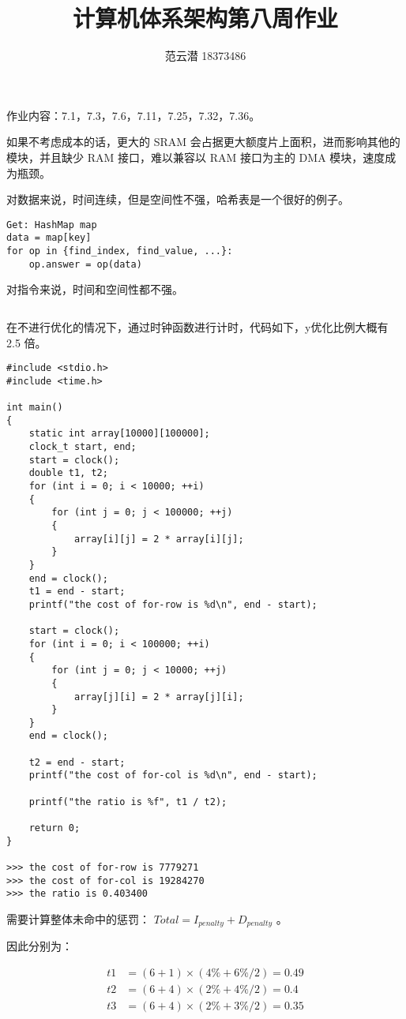\documentclass[lang=cn,11pt,a4paper,cite=authoryear]{elegantpaper}
\title{计算机体系架构\quad 第八周作业}
\author{范云潜 18373486}
\institute{微电子学院 184111 班}
\date{\zhtoday}
\begin{document}
\maketitle

作业内容：7.1，7.3，7.6，7.11，7.25，7.32，7.36。


如果不考虑成本的话，更大的 SRAM 会占据更大额度片上面积，进而影响其他的模块，并且缺少 RAM 接口，难以兼容以 RAM 接口为主的 DMA 模块，速度成为瓶颈。


对数据来说，时间连续，但是空间性不强，哈希表是一个很好的例子。

\begin{lstlisting}
Get: HashMap map
data = map[key]
for op in {find_index, find_value, ...}:
    op.answer = op(data)
\end{lstlisting}


对指令来说，时间和空间性都不强。

\begin{lstlisting}
\end{lstlisting}



在不进行优化的情况下，通过时钟函数进行计时，代码如下，y优化比例大概有 2.5 倍。

\begin{lstlisting}
#include <stdio.h>
#include <time.h>

int main()
{
    static int array[10000][100000];
    clock_t start, end;
    start = clock();
    double t1, t2;
    for (int i = 0; i < 10000; ++i)
    {
        for (int j = 0; j < 100000; ++j)
        {
            array[i][j] = 2 * array[i][j];
        }
    }
    end = clock();
    t1 = end - start;
    printf("the cost of for-row is %d\n", end - start);

    start = clock();
    for (int i = 0; i < 100000; ++i)
    {
        for (int j = 0; j < 10000; ++j)
        {
            array[j][i] = 2 * array[j][i];
        }
    }
    end = clock();

    t2 = end - start;
    printf("the cost of for-col is %d\n", end - start);

    printf("the ratio is %f", t1 / t2);

    return 0;
}

>>> the cost of for-row is 7779271
>>> the cost of for-col is 19284270
>>> the ratio is 0.403400                
\end{lstlisting}



需要计算整体未命中的惩罚： \(Total = I_{penalty} + D_{penalty}\) 。

因此分别为：

\[\begin{aligned}
    t1 &= (6 + 1) \times (4\% + 6\% / 2) = 0.49 \\
    t2 &= (6 + 4) \times (2\% + 4\% / 2) = 0.4 \\ 
    t3 &= (6 + 4) \times (2\% + 3\% / 2) = 0.35
\end{aligned}\]


\end{document}
